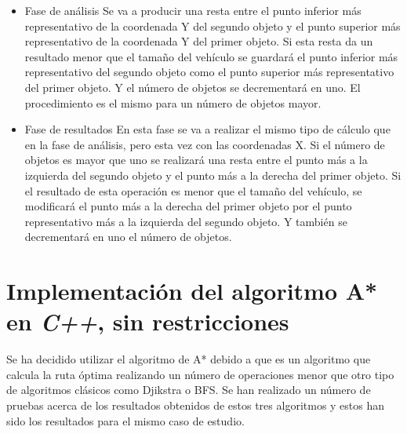 \begin{itemize}
\item Fase de análisis
\subitem Se va a producir una resta entre el punto inferior más representativo de la coordenada Y del segundo objeto y el punto superior más representativo de la coordenada Y del primer objeto. Si esta resta da un resultado menor que el tamaño del vehículo se guardará el punto inferior más representativo del segundo objeto como el punto superior más representativo del primer objeto. Y el número de objetos se decrementará en uno. El procedimiento es el mismo para un número de objetos mayor.
\item Fase de resultados
\subitem En esta fase se va a realizar el mismo tipo de cálculo que en la fase de análisis, pero esta vez con las coordenadas X. Si el número de objetos es mayor que uno se realizará una resta entre el punto más a la izquierda del segundo objeto y el punto más a la derecha del primer objeto. Si el resultado de esta operación es menor que el tamaño del vehículo, se modificará el punto más a la derecha del primer objeto por el punto representativo más a la izquierda del segundo objeto. Y también se decrementará en uno el número de objetos. 
\end{itemize}

\section{Implementación del algoritmo A* en \emph{C++}, sin restricciones}\label{sec:AEstrellaSoftware}

Se ha decidido utilizar el algoritmo de A* debido a que es un algoritmo que calcula la ruta óptima realizando un número de operaciones menor que otro tipo de algoritmos clásicos como Djikstra o \ac{BFS}. Se han realizado un número de pruebas acerca de los resultados obtenidos de estos tres algoritmos y estos han sido los resultados para el mismo caso de estudio. 

